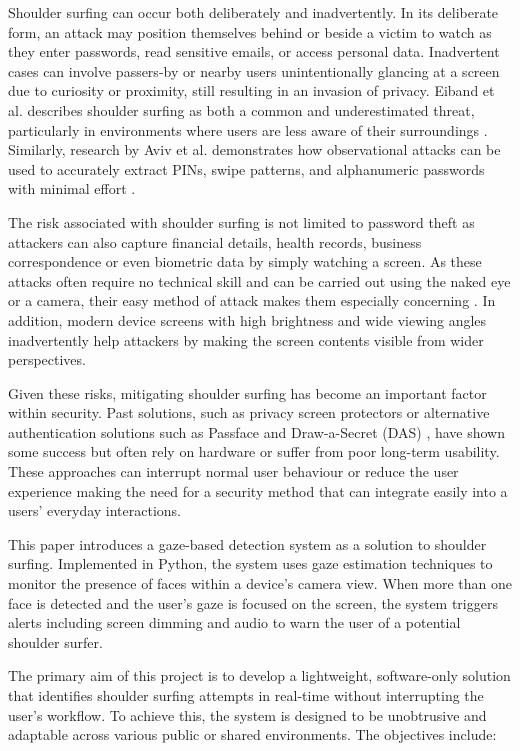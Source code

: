 \documentclass[12pt]{article}
\theoremstyle{plain}
\theoremstyle{definition}
\begin{document}
Shoulder surfing can occur both deliberately and inadvertently. In its deliberate form, an attack may position themselves behind or beside a victim to watch as they enter passwords, read sensitive emails, or access personal data. Inadvertent cases can involve passers-by or nearby users unintentionally glancing at a screen due to curiosity or proximity, still resulting in an invasion of privacy. Eiband et al. describes shoulder surfing as both a common and underestimated threat, particularly in environments where users are less aware of their surroundings \cite{eiband_understanding_2017}. Similarly, research by Aviv et al. demonstrates how observational attacks can be used to accurately extract PINs, swipe patterns, and alphanumeric passwords with minimal effort \cite{aviv_towards_2017}.

The risk associated with shoulder surfing is not limited to password theft as attackers can also capture financial details, health records, business correspondence or even biometric data by simply watching a screen. As these attacks often require no technical skill and can be carried out using the naked eye or a camera, their easy method of attack makes them especially concerning \cite{block_impact_2010}. In addition, modern device screens with high brightness and wide viewing angles inadvertently help attackers by making the screen contents visible from wider perspectives.

Given these risks, mitigating shoulder surfing has become an important factor within security. Past solutions, such as privacy screen protectors or alternative authentication solutions such as Passface \cite{liu_passface_2021} and Draw-a-Secret (DAS) \cite{nali_analyzing_2004}, have shown some success but often rely on hardware or suffer from poor long-term usability. These approaches can interrupt normal user behaviour or reduce the user experience making the need for a security method that can integrate easily into a users’ everyday interactions.

This paper introduces a gaze-based detection system as a solution to shoulder surfing. Implemented in Python, the system uses gaze estimation techniques to monitor the presence of faces within a device’s camera view. When more than one face is detected and the user’s gaze is focused on the screen, the system triggers alerts including screen dimming and audio to warn the user of a potential shoulder surfer.

The primary aim of this project is to develop a lightweight, software-only solution that identifies shoulder surfing attempts in real-time without interrupting the user’s workflow. To achieve this, the system is designed to be unobtrusive and adaptable across various public or shared environments. The objectives include:
\end{document}
